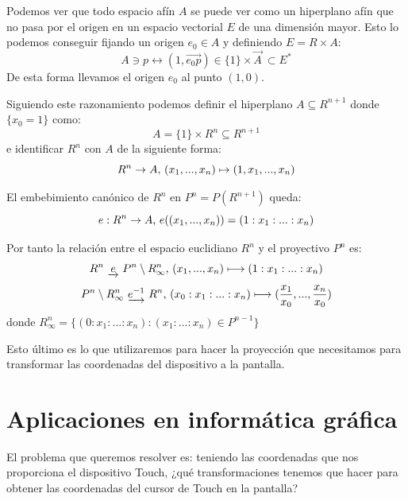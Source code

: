 \documentclass[a4paper,11pt, oneside]{book}
\begin{document}
Podemos ver que todo espacio afín $A$ se puede ver como un hiperplano afín que no pasa por el origen en un espacio vectorial $E$ de una dimensión mayor. Esto lo podemos conseguir fijando un origen $e_0 \in A$ y definiendo $E = R \times A$:
\begin{equation}
	A \ni p \longleftrightarrow (1, \overrightarrow{e_0p}) \in \{1\}\times\overrightarrow{A} \ \subset E^*
\end{equation}
De esta forma llevamos el origen $e_0$ al punto $(1,0)$. 

Siguiendo este razonamiento podemos definir el hiperplano $A \subseteq R^{n+1}$ donde $\{x_0 = 1\}$ como:
\begin{equation}
	A = \{1\} \times R^n \subseteq R^{n+1}
\end{equation}
e identificar $R^n$ con $A$ de la siguiente forma:
\begin{equation}
	R^n \rightarrow A \textup{,  } (x_1,...,x_n) \mapsto (1,x_1,...,x_n)
\end{equation}

El embebimiento canónico de $R^n$ en $P^n = P(R^{n+1})$ queda:
\begin{equation}
	e: R^n \rightarrow A \textup{,   } e((x_1,...,x_n)) = (1:x_1:...:x_n)
\end{equation}

Por tanto la relación entre el espacio euclidiano $R^n$ y el proyectivo $P^n$ es:
\begin{equation}
	R^n \textup{ } \underrightarrow{e} \textup{ } P^n \setminus R^n_{\infty}\textup{,     } (x_1,...,x_n) \longmapsto (1:x_1:...:x_n)
\end{equation}
\begin{equation}
	P^n \setminus R^n_{\infty} \textup{ }   \underrightarrow{e^{-1}} \textup{ }R^n \textup{,     } (x_0:x_1:...:x_n) \longmapsto (\frac{x_1}{x_0},...,\frac{x_n}{x_0})
\end{equation}
donde $R^n_{\infty} = \{(0:x_1:...:x_n) : (x_1:...:x_n) \in  P^{n-1}\}$

Esto último es lo que utilizaremos para hacer la proyección que necesitamos para transformar las coordenadas del dispositivo a la pantalla.


\section{Aplicaciones en informática gráfica}

El problema que queremos resolver es: teniendo las coordenadas que nos proporciona el dispositivo Touch, ¿qué transformaciones tenemos que hacer para obtener las coordenadas del cursor de Touch en la pantalla?
\end{document}
